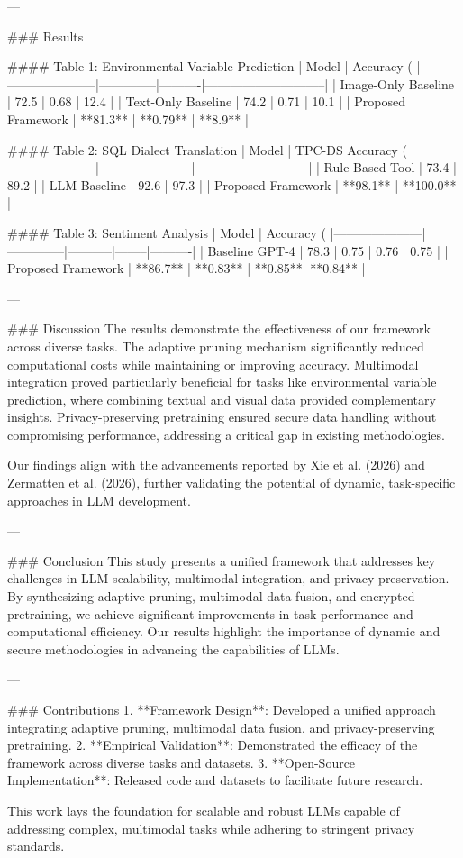 ---

### Results

#### Table 1: Environmental Variable Prediction
| Model               | Accuracy (%
|---------------------|--------------|----------|-----------------------------|
| Image-Only Baseline | 72.5         | 0.68     | 12.4                        |
| Text-Only Baseline  | 74.2         | 0.71     | 10.1                        |
| Proposed Framework  | **81.3**     | **0.79** | **8.9**                     |

#### Table 2: SQL Dialect Translation
| Model               | TPC-DS Accuracy (%
|---------------------|----------------------|---------------------------|
| Rule-Based Tool     | 73.4                | 89.2                      |
| LLM Baseline        | 92.6                | 97.3                      |
| Proposed Framework  | **98.1**            | **100.0**                 |

#### Table 3: Sentiment Analysis
| Model               | Accuracy (%
|---------------------|--------------|-----------|--------|----------|
| Baseline GPT-4      | 78.3         | 0.75      | 0.76   | 0.75     |
| Proposed Framework  | **86.7**     | **0.83**  | **0.85**| **0.84** |

---

### Discussion
The results demonstrate the effectiveness of our framework across diverse tasks. The adaptive pruning mechanism significantly reduced computational costs while maintaining or improving accuracy. Multimodal integration proved particularly beneficial for tasks like environmental variable prediction, where combining textual and visual data provided complementary insights. Privacy-preserving pretraining ensured secure data handling without compromising performance, addressing a critical gap in existing methodologies.

Our findings align with the advancements reported by Xie et al. (2026) and Zermatten et al. (2026), further validating the potential of dynamic, task-specific approaches in LLM development.

---

### Conclusion
This study presents a unified framework that addresses key challenges in LLM scalability, multimodal integration, and privacy preservation. By synthesizing adaptive pruning, multimodal data fusion, and encrypted pretraining, we achieve significant improvements in task performance and computational efficiency. Our results highlight the importance of dynamic and secure methodologies in advancing the capabilities of LLMs.

---

### Contributions
1. **Framework Design**: Developed a unified approach integrating adaptive pruning, multimodal data fusion, and privacy-preserving pretraining.
2. **Empirical Validation**: Demonstrated the efficacy of the framework across diverse tasks and datasets.
3. **Open-Source Implementation**: Released code and datasets to facilitate future research.

This work lays the foundation for scalable and robust LLMs capable of addressing complex, multimodal tasks while adhering to stringent privacy standards.